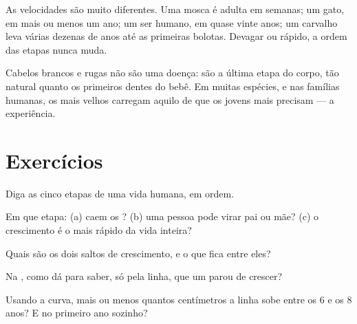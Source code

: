 \begin{example}\label{ex:g3:stages-of-life:speeds}
As velocidades são muito diferentes. Uma mosca é adulta em semanas;
um gato, em mais ou menos um ano; um ser humano, em quase vinte
anos; um carvalho leva várias dezenas de anos até as primeiras
bolotas. Devagar ou rápido, a ordem das etapas nunca muda.
\end{example}

\begin{remark}\label{rem:g3:stages-of-life:oldage}
Cabelos brancos e rugas não são uma doença: são a última etapa do
corpo, tão natural quanto os primeiros dentes do bebê. Em muitas
espécies, e nas famílias humanas, os mais velhos carregam aquilo de
que os jovens mais precisam --- a experiência.
\end{remark}

\section{Exercícios}

\begin{exercise}[$\star$]\label{exo:g3:stages-of-life:1}
Diga as cinco etapas de uma vida humana, em ordem.
\end{exercise}

\begin{exercise}[$\star$]\label{exo:g3:stages-of-life:2}
Em que etapa: (a) caem os ? (b) uma pessoa pode virar
pai ou mãe? (c) o crescimento é o mais rápido da vida inteira?
\end{exercise}

\begin{exercise}[$\star$]\label{exo:g3:stages-of-life:3}
Quais são os dois saltos de crescimento, e o que fica entre eles?
\end{exercise}

\begin{exercise}[$\star$]\label{exo:g3:stages-of-life:4}
Na , como dá para saber, só pela linha, que um
 parou de crescer?
\end{exercise}

\begin{exercise}[$\star$]\label{exo:g3:stages-of-life:5}
Usando a curva, mais ou menos quantos centímetros a linha sobe entre
os $6$ e os $8$ anos? E no primeiro ano sozinho?
\end{exercise}

